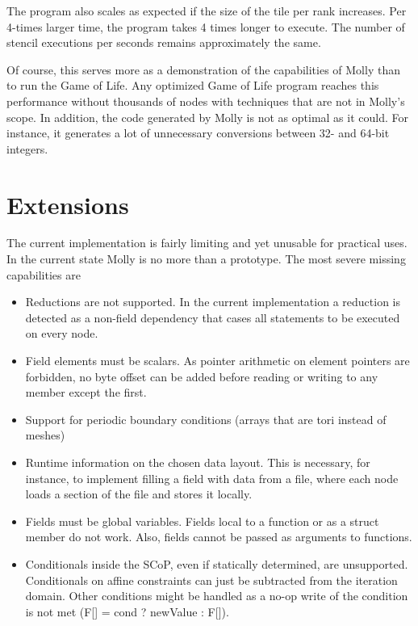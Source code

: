 \documentclass{sigplanconf}
\begin{document}
The program also scales as expected if the size of the tile per rank increases. Per 4-times larger time, the program takes 4 times longer to execute. The number of stencil executions per seconds remains approximately the same.

Of course, this serves more as a demonstration of the capabilities of Molly than to run the Game of Life. Any optimized Game of Life program reaches this performance without thousands of nodes with techniques that are not in Molly's scope. In addition, the code generated by Molly is not as optimal as it could. For instance, it generates a lot of unnecessary conversions between 32- and 64-bit integers.



\section{Extensions}\label{sct:extensions}

The current implementation is fairly limiting and yet unusable for practical uses. In the current state Molly is no more than a prototype. The most severe missing capabilities are

\begin{itemize}
\item Reductions are not supported. In the current implementation a reduction is detected as a non-field dependency that cases all statements to be executed on every node.
\item Field elements must be scalars. As pointer arithmetic on element pointers are forbidden, no byte offset can be added before reading or writing to any member except the first.
\item Support for periodic boundary conditions (arrays that are tori instead of meshes)
\item Runtime information on the chosen data layout. This is necessary, for instance, to implement filling a field with data from a file, where each node loads a section of the file and stores it locally.
\item Fields must be global variables. Fields local to a function or as a struct member do not work. Also, fields cannot be passed as arguments to functions.
\item Conditionals inside the SCoP, even if statically determined, are unsupported. Conditionals on affine constraints can just be subtracted from the iteration domain. Other conditions might be handled as a no-op write of the condition is not met (F[] = cond ? newValue : F[]).
\end{itemize}
\end{document}
